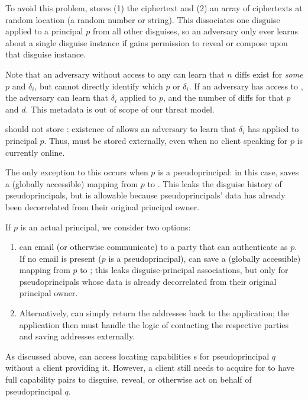 To avoid this problem, \sys stores (1) the  ciphertext and (2) an array of
 ciphertexts at random location  (\eg a random number or string).
This dissociates one disguise applied to a principal $p$ from all other disguises, so an adversary only ever
learns about a single disguise instance if \sys gains permission to reveal or compose upon that
disguise instance.

Note that an adversary without access to any  can learn that $n$ diffs exist for
\emph{some} $p$ and $\delta_i$, but cannot directly identify which $p$ or $\delta_i$.
If an adversary has access to , the adversary can learn that $\delta_i$
applied to $p$, and the number of  diffs for that $p$ and $d$. This metadata is out of scope of our threat model.

\sys should not store : existence of  allows an adversary to
learn that $\delta_i$ has applied to principal $p$. Thus,  must be stored externally,
even when no client speaking for $p$ is currently online.

The only exception to this occurs when $p$ is a pseudoprincipal: in this case, \sys saves a
(globally accessible) mapping from $p$ to . This leaks the disguise history of
pseudoprincipals, but is allowable because pseudoprincipals' data has already been decorrelated from their
original principal owner.

If $p$ is an actual principal, we consider two options: 
\begin{enumerate}
    \item \sys can email (or otherwise communicate)
 to a party that can authenticate as $p$. If no email is present (\eg $p$ is a pseudoprincipal),
\sys can save a (globally accessible) mapping from $p$ to ; this leaks disguise-principal associations, but
only for pseudoprincipals whose data is already decorrelated from their original principal owner.
\item Alternatively, \sys can simply return the addresses back to the application; the application
then must handle the logic of contacting the respective parties and saving addresses externally.
\end{enumerate}

As discussed above, \sys can access locating capabilities s for pseudoprincipal $q$ without a
client providing it. 
%
However, a client still needs to acquire  for \sys to have full capability pairs
to disguise, reveal, or otherwise act on behalf of pseudoprincipal $q$.


